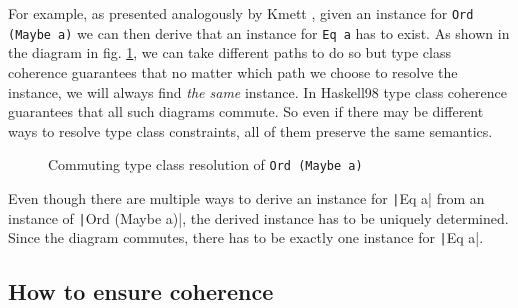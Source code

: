 For example, as presented analogously by Kmett \cite{kmett2015}, given an instance for \texttt{Ord (Maybe a)} we can then derive that an instance for \texttt{Eq a} has to exist.
As shown in the diagram in fig. \ref{fig:commuting-resolution}, we can take different paths to do so but type class coherence guarantees that no matter which path we choose to resolve the instance, we will always find \emph{the same} instance.
In Haskell98 type class coherence guarantees that all such diagrams commute.
So even if there may be different ways to resolve type class constraints, all of them preserve the same semantics.

\begin{figure}[ht]
  \caption{Commuting type class resolution of \texttt{Ord (Maybe a)}}
  \label{fig:commuting-resolution}
\end{figure}

Even though there are multiple ways to derive an instance for \texttt|Eq a| from an instance of \texttt|Ord (Maybe a)|, the derived instance has to be uniquely determined.
Since the diagram commutes, there has to be exactly one instance for \texttt|Eq a|.

\subsection{How to ensure coherence}

